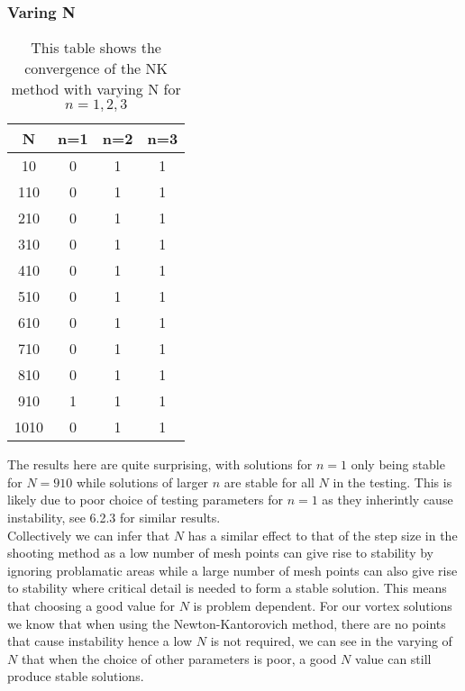 \documentclass{article}
\begin{document}
\subsubsection{Varing N}
\begin{table}[H]
\centering
\begin{tabular}{|c|c|c|c|}
\hline
N & n=1 &  n=2 &  n=3 \\
\hline
10   & 0 & 1 & 1\\
110  & 0 & 1 & 1\\
210  & 0 & 1 & 1\\
310  & 0 & 1 & 1\\
410  & 0 & 1 & 1\\
510  & 0 & 1 & 1\\
610  & 0 & 1 & 1\\
710  & 0 & 1 & 1\\
810  & 0 & 1 & 1\\
910  & 1 & 1 & 1\\
1010 & 0 & 1 & 1\\
\hline
\end{tabular}
\caption{This table shows the convergence of the NK method with varying N for $n=1,2,3$}
\end{table}
The results here are quite surprising, with solutions for $n=1$ only being stable for $N=910$ while solutions of larger $n$ are stable for all $N$ in the testing. This is likely due to poor choice of testing parameters for $n=1$ as they inherintly cause instability, see 6.2.3 for similar results. \\
Collectively we can infer that $N$ has a similar effect to that of the step size in the shooting method as a low number of mesh points can give rise to stability by ignoring problamatic areas while a large number of mesh points can also give rise to stability where critical detail is needed to form a stable solution. This means that choosing a good value for $N$ is problem dependent. For our vortex solutions we know that when using the Newton-Kantorovich method, there are no points that cause instability hence a low $N$ is not required, we can see in the varying of $N$ that when the choice of other parameters is poor, a good $N$ value can still produce stable solutions. 
\end{document}
